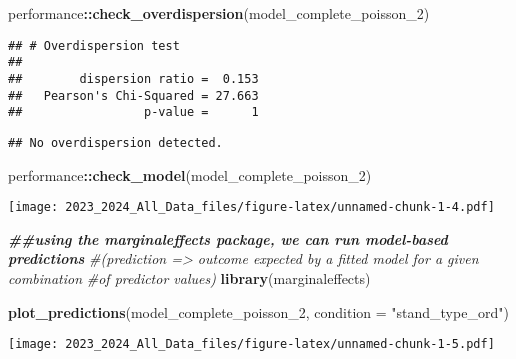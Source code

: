 \documentclass[
]{article}
\newenvironment{Shaded}{\begin{snugshade}}{\end{snugshade}}
\newcommand{\AttributeTok}[1]{\textcolor[rgb]{0.13,0.29,0.53}{#1}}
\newcommand{\CommentTok}[1]{\textcolor[rgb]{0.56,0.35,0.01}{\textit{#1}}}
\newcommand{\DocumentationTok}[1]{\textcolor[rgb]{0.56,0.35,0.01}{\textbf{\textit{#1}}}}
\newcommand{\FunctionTok}[1]{\textcolor[rgb]{0.13,0.29,0.53}{\textbf{#1}}}
\newcommand{\NormalTok}[1]{#1}
\newcommand{\SpecialCharTok}[1]{\textcolor[rgb]{0.81,0.36,0.00}{\textbf{#1}}}
\newcommand{\StringTok}[1]{\textcolor[rgb]{0.31,0.60,0.02}{#1}}
\begin{document}
\begin{Shaded}
\begin{Highlighting}[]
\NormalTok{performance}\SpecialCharTok{::}\FunctionTok{check\_overdispersion}\NormalTok{(model\_complete\_poisson\_2)}
\end{Highlighting}
\end{Shaded}

\begin{verbatim}
## # Overdispersion test
## 
##        dispersion ratio =  0.153
##   Pearson's Chi-Squared = 27.663
##                 p-value =      1
\end{verbatim}

\begin{verbatim}
## No overdispersion detected.
\end{verbatim}

\begin{Shaded}
\begin{Highlighting}[]
\NormalTok{performance}\SpecialCharTok{::}\FunctionTok{check\_model}\NormalTok{(model\_complete\_poisson\_2)}
\end{Highlighting}
\end{Shaded}

\texttt{[image: 2023\_2024\_All\_Data\_files/figure-latex/unnamed-chunk-1-4.pdf]}

\begin{Shaded}
\begin{Highlighting}[]
\DocumentationTok{\#\#using the \textquotesingle{}marginaleffects\textquotesingle{} package, we can run model{-}based predictions }
\CommentTok{\#(prediction =\textgreater{} outcome expected by a fitted model for a given combination}
\CommentTok{\#of predictor values)}
\FunctionTok{library}\NormalTok{(marginaleffects)}

\FunctionTok{plot\_predictions}\NormalTok{(model\_complete\_poisson\_2, }\AttributeTok{condition =} \StringTok{"stand\_type\_ord"}\NormalTok{)}
\end{Highlighting}
\end{Shaded}

\texttt{[image: 2023\_2024\_All\_Data\_files/figure-latex/unnamed-chunk-1-5.pdf]}
\end{document}
